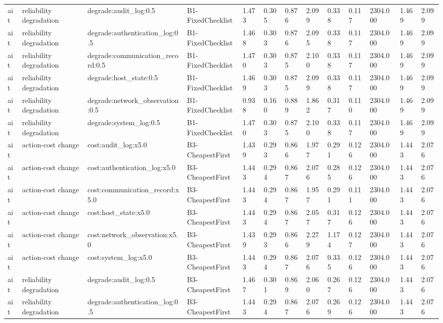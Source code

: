 \begin{table}[!ht]
{\begin{tabular}{lllllllllllll}
ait & reliability degradation & degrade:audit\_log:0.5 & B1-FixedChecklist & 1.473 & 0.305 & 0.876 & 2.099 & 0.338 & 0.117 & 2304.000 & 1.469 & 2.099 \\
ait & reliability degradation & degrade:authentication\_log:0.5 & B1-FixedChecklist & 1.468 & 0.303 & 0.876 & 2.095 & 0.338 & 0.117 & 2304.000 & 1.469 & 2.099 \\
ait & reliability degradation & degrade:communication\_record:0.5 & B1-FixedChecklist & 1.470 & 0.303 & 0.875 & 2.100 & 0.338 & 0.117 & 2304.000 & 1.469 & 2.099 \\
ait & reliability degradation & degrade:host\_state:0.5 & B1-FixedChecklist & 1.469 & 0.303 & 0.875 & 2.099 & 0.338 & 0.117 & 2304.000 & 1.469 & 2.099 \\
ait & reliability degradation & degrade:network\_observation:0.5 & B1-FixedChecklist & 0.938 & 0.160 & 0.889 & 1.862 & 0.317 & 0.110 & 2304.000 & 1.469 & 2.099 \\
ait & reliability degradation & degrade:system\_log:0.5 & B1-FixedChecklist & 1.470 & 0.303 & 0.875 & 2.100 & 0.338 & 0.117 & 2304.000 & 1.469 & 2.099 \\
ait & action-cost change & cost:audit\_log:x5.0 & B3-CheapestFirst & 1.439 & 0.293 & 0.866 & 1.977 & 0.291 & 0.126 & 2304.000 & 1.443 & 2.076 \\
ait & action-cost change & cost:authentication\_log:x5.0 & B3-CheapestFirst & 1.443 & 0.294 & 0.867 & 2.076 & 0.285 & 0.126 & 2304.000 & 1.443 & 2.076 \\
ait & action-cost change & cost:communication\_record:x5.0 & B3-CheapestFirst & 1.443 & 0.294 & 0.867 & 1.957 & 0.291 & 0.111 & 2304.000 & 1.443 & 2.076 \\
ait & action-cost change & cost:host\_state:x5.0 & B3-CheapestFirst & 1.443 & 0.294 & 0.867 & 2.057 & 0.317 & 0.126 & 2304.000 & 1.443 & 2.076 \\
ait & action-cost change & cost:network\_observation:x5.0 & B3-CheapestFirst & 1.439 & 0.293 & 0.866 & 2.279 & 1.174 & 0.127 & 2304.000 & 1.443 & 2.076 \\
ait & action-cost change & cost:system\_log:x5.0 & B3-CheapestFirst & 1.443 & 0.294 & 0.867 & 2.076 & 0.335 & 0.126 & 2304.000 & 1.443 & 2.076 \\
ait & reliability degradation & degrade:audit\_log:0.5 & B3-CheapestFirst & 1.467 & 0.301 & 0.869 & 2.060 & 0.267 & 0.126 & 2304.000 & 1.443 & 2.076 \\
ait & reliability degradation & degrade:authentication\_log:0.5 & B3-CheapestFirst & 1.443 & 0.294 & 0.867 & 2.076 & 0.269 & 0.126 & 2304.000 & 1.443 & 2.076 \\

\end{tabular}}
\end{table}
